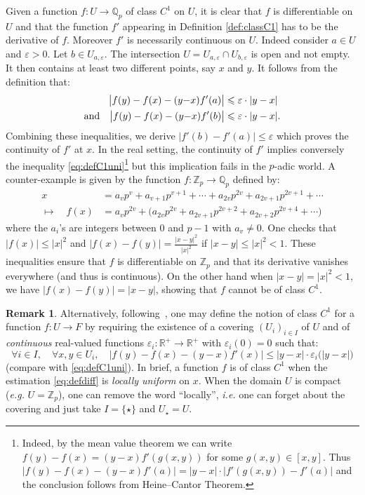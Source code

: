 \documentclass[11pt]{article}
\numberwithin{equation}{section}
\numberwithin{figure}{section}
\renewcommand{\leq}{\leqslant}
\theoremstyle{definition}
\newtheorem{rem}[theo]{Remark}
\newcommand{\Z}{\mathbb Z}
\newcommand{\Zp}{\Z_p}
\newcommand{\Q}{\mathbb Q}
\newcommand{\Qp}{\Q_p}
\newcommand{\R}{\mathbb R}
\begin{document}
Given a function $f : U \to \Qp$ of class $C^1$ on $U$, it is clear
that $f$ is differentiable on $U$ and that the function $f'$ appearing in
Definition \ref{def:classC1} has to be the derivative of $f$. Moreover
$f'$ is necessarily continuous on $U$. Indeed consider $a \in U$ and
$\varepsilon > 0$. Let $b \in U_{a,\varepsilon}$. 
The intersection $U = U_{a,\varepsilon} \cap U_{b,\varepsilon}$ is 
open and not empty. It then contains at least two different points,
say $x$ and $y$. It follows from the definition that:
\begin{align*}
\big|f(y) - f(x) - (y{-}x) f'(a)\big| 
 & \leq \varepsilon \cdot |y-x| \smallskip \\ 
\text{and} \quad
\big|f(y) - f(x) - (y{-}x) f'(b)\big| 
 & \leq \varepsilon \cdot |y-x|. 
\end{align*}
Combining these inequalities, we derive
$\big| f'(b) - f'(a) \big| \leq \varepsilon$
which proves the continuity of $f'$ at $x$.
In the real setting, the continuity of $f'$ implies conversely the inequality 
\eqref{eq:defC1uni}\footnote{Indeed, by the mean value theorem we can write 
$f(y) - f(x) = (y-x)f'(g(x,y))$ for some $g(x,y) \in [x,y]$. Thus $|f(y) 
- f(x) - (y-x) f'(a)| = |y-x| \cdot |f'(g(x,y)) - f'(a)|$ and the 
conclusion follows from Heine--Cantor Theorem.} but this implication
fails in the $p$-adic world. A counter-example is given by the function
$f : \Zp \to \Qp$ defined by:
\begin{align*}
x & 
= a_v p^v + a_{v+1} p^{v+1} + \cdots + a_{2v} p^{2v} + a_{2v+1} p^{2v+1} + \cdots \\
\mapsto \quad f(x) & 
= a_v p^{2v} + \big(a_{2v} p^{2v} + a_{2v+1} p^{2v+2} + a_{2v+2} p^{2v+4} + \cdots \big)
\end{align*}
where the $a_i$'s are integers between $0$ and $p{-}1$ with $a_v \neq 0$.
One checks that $|f(x)| \leq |x|^2$ and $|f(x) - f(y)| = 
\frac{|x-y|^2}{|x|^2}$ if $|x-y| \leq |x|^2 < 1$. These inequalities 
ensure that $f$ is differentiable on $\Zp$ and that its derivative 
vanishes everywhere (and thus is continuous). On the other hand when 
$|x-y| = |x|^2 < 1$, we have $|f(x) - f(y)| = |x - y|$, showing that $f$ 
cannot be of class $C^1$.

\begin{rem}
\label{rem:altdefC1uni}
Alternatively, following~\cite{Co10}, one may define the notion of class 
$C^1$ for a function $f : U \to F$ by requiring the existence of a 
covering $(U_i)_{i \in I}$ of $U$ and of \emph{continuous} real-valued 
functions $\varepsilon_i : \R^+ \to \R^+$ with 
$\varepsilon_i(0) = 0$ such that:
\begin{equation}
\label{eq:defC1uni2}
\forall i \in I, \quad \forall x, y \in U_i, \quad 
\big|f(y) - f(x) - (y{-}x) f'(x)\big| \leq  |y{-}x| \cdot
\varepsilon_i\big(|y{-}x|\big)
\end{equation}
(compare with \eqref{eq:defC1uni}). In brief, a function $f$ is of class 
$C^1$ when the estimation \eqref{eq:defdiff} is \emph{locally uniform} 
on $x$. When the domain $U$ is compact (\emph{e.g.} $U = \Zp$), one 
can remove the word ``locally'', \emph{i.e.} one can forget about the 
covering and just take $I = \{\star\}$ and $U_\star = U$.
\end{rem}
\end{document}

